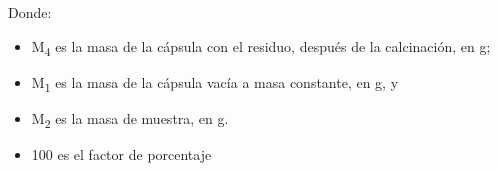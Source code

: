 Donde: 
\begin{itemize}
    \item M\textsubscript{4} es la masa de la cápsula con el residuo, después de la calcinación, en g;
    \item M\textsubscript{1} es la masa de la cápsula vacía a masa constante, en g, y
    \item M\textsubscript{2} es la masa de muestra, en g.
    \item 100 es el factor de porcentaje
\end{itemize}